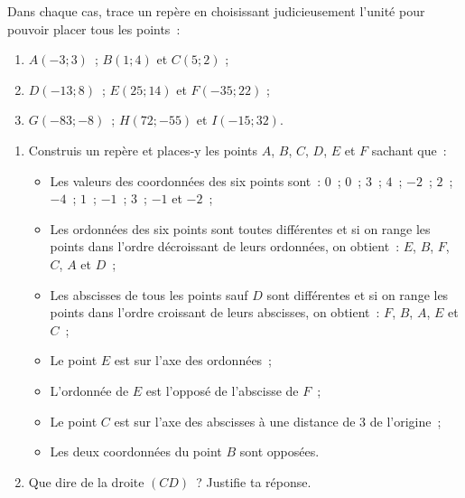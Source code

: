 \begin{exercice}[Repères]
Dans chaque cas, trace un repère en choisissant judicieusement l'unité pour pouvoir placer tous les points :
\begin{enumerate}
 \item $A(-3 ; 3)$ ; $B(1 ; 4)$ et $C(5 ; 2)$ ; 
 \item $D(-13 ; 8)$ ; $E(25 ; 14)$ et $F(-35 ; 22)$ ;
 \item $G(-83 ; -8)$ ; $H(72 ; -55)$ et $I(-15 ; 32)$.
 \end{enumerate}
\end{exercice}


\begin{exercice}
\begin{enumerate}
 \item Construis un repère et places-y les points $A$, $B$, $C$, $D$, $E$ et $F$ sachant que :
 \begin{itemize}
  \item Les valeurs des coordonnées des six points sont :
$0$ ; $0$ ; $3$ ; $4$ ; $-2$ ; $2$ ; $-4$ ; $1$ ; $-1$ ; $3$ ; $-1$ et $-2$ ;
  \item Les ordonnées des six points sont toutes différentes et si on range les points dans l'ordre décroissant de leurs ordonnées, on obtient : $E$, $B$, $F$, $C$, $A$ et $D$ ;
  \item Les abscisses de tous les points sauf $D$ sont différentes et si on range les points dans l'ordre croissant de leurs abscisses, on obtient : $F$, $B$, $A$, $E$ et $C$ ;
  \item Le point $E$ est sur l'axe des ordonnées ;
  \item L'ordonnée de $E$ est l'opposé de l'abscisse de $F$ ;
  \item Le point $C$ est sur l'axe des abscisses à une distance de 3 de l'origine ;
  \item Les deux coordonnées du point $B$ sont opposées.
  \end{itemize}
 \item Que dire de la droite $(CD)$ ? Justifie ta réponse.
 \end{enumerate}
\end{exercice}



